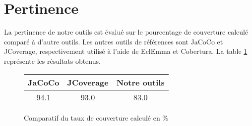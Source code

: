\section{Pertinence}

La pertinence de notre outils est évalué sur le pourcentage de couverture calculé comparé à d'autre outils. Les autres outils de références sont JaCoCo et JCoverage, respectivement utilisé à l'aide de EclEmma et Cobertura. La table \ref{evaluation_pertinence} représente les résultats obtenus. 

\begin{figure}[h]

\centering
\begin{tabular}{|c|c|c|}
  \hline
  JaCoCo & JCoverage & Notre outils \\
  \hline
  94.1 & 93.0 & 83.0 \\
  \hline
\end{tabular}

\label{evaluation_pertinence}
\caption{Comparatif du taux de couverture calculé en \%}
\end{figure}